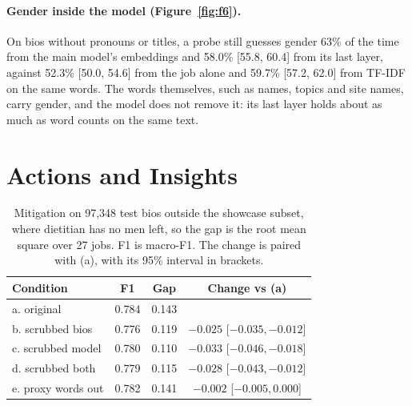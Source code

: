 \documentclass[11pt]{article}
\newcommand{\fig}[1]{Figure~\ref{fig:#1}}
\begin{document}
\paragraph{Gender inside the model (\fig{f6}).} On bios without pronouns or titles, a probe still guesses gender 63\% of the time from the main model's embeddings and 58.0\% [55.8, 60.4] from its last layer, against 52.3\% [50.0, 54.6] from the job alone and 59.7\% [57.2, 62.0] from TF-IDF on the same words. The words themselves, such as names, topics and site names, carry gender, and the model does not remove it: its last layer holds about as much as word counts on the same text.

\section{Actions and Insights}

\begin{table}[!tbp]
\footnotesize
\centering
\setlength{\tabcolsep}{2pt}
\begin{tabular}{@{}lccc@{}}
\toprule
Condition & F1 & Gap & Change vs (a) \\
\midrule
a. original & 0.784 & 0.143 & \\
b. scrubbed bios & 0.776 & 0.119 & $-0.025$ [$-0.035,-0.012$] \\
c. scrubbed model & 0.780 & 0.110 & $-0.033$ [$-0.046,-0.018$] \\
d. scrubbed both & 0.779 & 0.115 & $-0.028$ [$-0.043,-0.012$] \\
e. proxy words out & 0.782 & 0.141 & $-0.002$ [$-0.005,0.000$] \\
\bottomrule
\end{tabular}
\caption{Mitigation on 97,348 test bios outside the showcase subset, where dietitian has no men left, so the gap is the root mean square over 27 jobs. F1 is macro-F1. The change is paired with (a), with its 95\% interval in brackets.}
\label{tab:mitigation}
\end{table}
\end{document}

